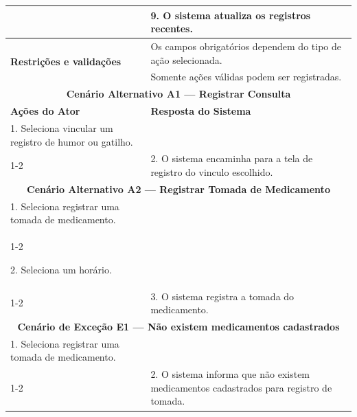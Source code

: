 \begin{longtable}{| p{} | p{} |}
&
9. O sistema atualiza os registros recentes. \\
\hline

\multirow{2}{.40\textwidth}{\textbf{Restrições e validações}}
&
Os campos obrigatórios dependem do tipo de ação selecionada. \\
\cline{2-2}

&
Somente ações válidas podem ser registradas. \\
\hline

\multicolumn{2}{|c|}{\textbf{Cenário Alternativo A1 --- Registrar Consulta}}\\
\hline

\textbf{Ações do Ator} &
\textbf{Resposta do Sistema} \\
\hline

1. Seleciona vincular um registro de humor ou gatilho. & \\
\cline{1-2}

&
2. O sistema encaminha para a tela de registro do vinculo escolhido. \\

\hline

\multicolumn{2}{|c|}{\textbf{Cenário Alternativo A2 --- Registrar Tomada de Medicamento}}\\
\hline

1. Seleciona registrar uma tomada de medicamento. & \\
\cline{1-2}

2. Seleciona um horário. & \\
\cline{1-2}

&
3. O sistema registra a tomada do medicamento. \\
\hline

\multicolumn{2}{|c|}{\textbf{Cenário de Exceção E1 --- Não existem medicamentos cadastrados}}\\
\hline

1. Seleciona registrar uma tomada de medicamento. & \\
\cline{1-2}

&
2. O sistema informa que não existem medicamentos cadastrados para
registro de tomada. \\

\hline

\end{longtable}
